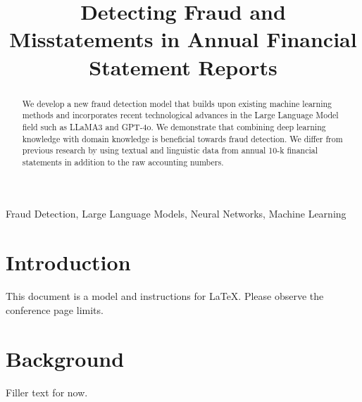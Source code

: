 \documentclass[conference]{IEEEtran}
\begin{document}
\title{Detecting Fraud and Misstatements in Annual Financial Statement Reports}

\author{\and
{}
\and
{}
\and
}

\maketitle

\begin{abstract} We develop a new fraud detection model that builds upon existing machine learning methods and incorporates recent technological advances in the Large Language Model field such as LLaMA3 and GPT-4o. We demonstrate that combining deep learning knowledge with domain knowledge is beneficial towards fraud detection. We differ from previous research by using textual and linguistic data from annual 10-k financial statements in addition to the raw accounting numbers. 
\end{abstract}

\begin{IEEEkeywords}
Fraud Detection, Large Language Models, Neural Networks, Machine Learning
\end{IEEEkeywords}

\section{Introduction}
This document is a model and instructions for \LaTeX.
Please observe the conference page limits. 

\section{Background}
Filler text for now.
\end{document}
